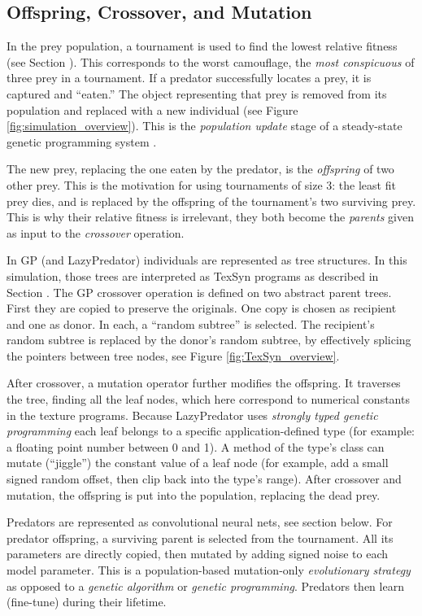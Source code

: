 \documentclass[letterpaper]{article}
\newcommand{\jargon}[1]{\textit{#1}}
\newcommand{\texsyn}[0]{TexSyn}
\newcommand{\lazypredator}[0]{LazyPredator}
\begin{document}
\subsection{Offspring, Crossover, and Mutation}
In the prey population, a tournament is used to find the lowest relative fitness (see Section ). This corresponds to the worst camouflage, the \jargon{most conspicuous} of three prey in a tournament. If a predator successfully locates a prey, it is captured and “eaten.” The object representing that prey is removed from its population and replaced with a new individual (see Figure \ref{fig:simulation_overview}). This is the \jargon{population update} stage of a steady-state genetic programming system \citep{syswerda_study_1991}.
\par
The new prey, replacing the one eaten by the predator, is the \jargon{offspring} of two other prey. This is the motivation for using tournaments of size 3: the least fit prey dies, and is replaced by the offspring of the tournament's two surviving prey. This is why their relative fitness is irrelevant, they both become the \jargon{parents} given as input to the \jargon{crossover} operation.
\par
In GP (and \lazypredator{}) individuals are represented as tree structures. In this simulation, those trees are interpreted as \texsyn{} programs as described in Section . The GP crossover operation is defined on two abstract parent trees. First they are copied to preserve the originals. One copy is chosen as recipient and one as donor. In each, a “random subtree” is selected. The recipient's random subtree is replaced by the donor's random subtree, by effectively splicing the pointers between tree nodes, see Figure \ref{fig:TexSyn_overview}.
\par
After crossover, a mutation operator further modifies the offspring. It traverses the tree, finding all the leaf nodes, which here correspond to numerical constants in the texture programs. Because \lazypredator{} uses \jargon{strongly typed genetic programming} \citep{montana_strongly_1995} each leaf belongs to a specific application-defined type (for example: a floating point number between 0 and 1). A method of the type's class can mutate (“jiggle”) the constant value of a leaf node (for example, add a small signed random offset, then clip back into the type's range). After crossover and mutation, the offspring is put into the population, replacing the dead prey.
\par
Predators are represented as convolutional neural nets, see section  below. For predator offspring, a surviving parent is selected from the tournament. All its parameters are directly copied, then mutated by adding signed noise to each model parameter. This is a population-based mutation-only \jargon{evolutionary strategy} as opposed to a \jargon{genetic algorithm} or \jargon{genetic programming}. Predators then learn (fine-tune) during their lifetime.
\par
\end{document}
